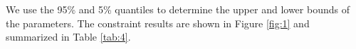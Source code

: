 \documentclass[twocolumn]{aastex631}
\begin{document}
   We use the 95\% and 5\% quantiles to determine the upper and lower
   bounds of the parameters. The  constraint results are shown in 
   Figure \ref{fig:1} and summarized in Table \ref{tab:4}.

   \begin{figure}
      \centering
\end{figure}
\end{document}
